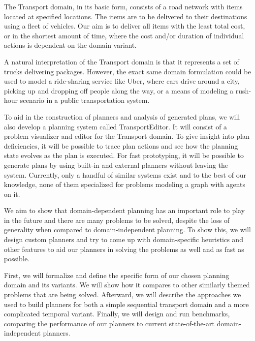 The Transport domain, in its basic form, consists of a road network with items located at specified locations. The items are to be delivered to their destinations
using a fleet of vehicles. Our aim is to deliver all items
with the least total cost, or in the shortest amount of time,
where the cost and/or duration of individual actions is dependent on the domain variant.

A natural interpretation of the Transport domain is that it represents a set of trucks
delivering packages. However,
the exact same domain formulation could be used to
model a ride-sharing service like Uber, where cars drive around a city, picking up and dropping off people along the way, or
a means of modeling a rush-hour scenario in a public transportation system.

To aid in the construction of planners and analysis of generated
plans, we will also develop a planning system called TransportEditor. It will consist of a problem visualizer and editor for the Transport domain. To give insight into plan deficiencies, it will be possible to trace plan actions and see how the planning
state evolves as the plan is executed. For fast prototyping,
it will be possible to generate plans by using built-in and external planners without leaving the system. Currently, only a handful of similar systems exist and to the best of our knowledge, none of them specialized for problems modeling a graph with agents on it.

We aim to show that domain-dependent planning has an important
role to play in the future and there are many problems to be solved,
despite the loss of generality when compared to domain-independent planning.
To show this, we will design custom planners
and try to come up with domain-specific heuristics and other features
to aid our planners in solving the problems as well and as fast as
possible.

First, we will formalize and define the specific form of our
chosen planning domain and its variants. We will show how
it compares to other similarly themed problems that are being
solved. Afterward, we will describe the approaches we used
to build planners for both a
simple sequential transport domain and a more complicated
temporal variant. Finally, we will design and run benchmarks,
comparing the performance of our planners to current
state-of-the-art domain-independent planners.
